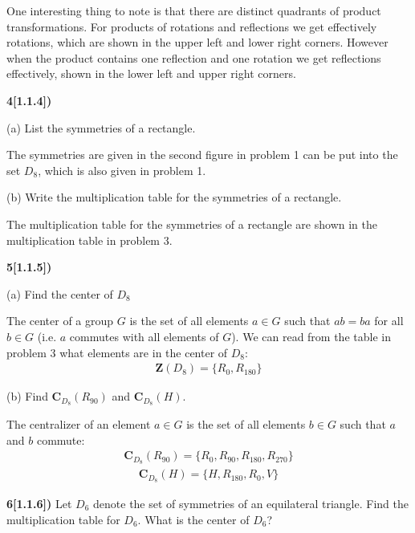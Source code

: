 \documentclass[12pt,a4paper]{article}
\newcommand{\prob}[2]{\textbf{#1)} #2}
\begin{document}
One interesting thing to note is that there are distinct quadrants of product transformations. For products of rotations and reflections we get effectively rotations, which are shown in the upper left and lower right corners. However when the product contains one reflection and one rotation we get reflections effectively, shown in the lower left and upper right corners.

\prob{4[1.1.4]}{}

(a) List the symmetries of a rectangle.

The symmetries are given in the second figure in problem 1 can be put into the set $D_8$, which is also given in problem 1.

(b) Write the multiplication table for the symmetries of a rectangle.

The multiplication table for the symmetries of a rectangle are shown in the multiplication table in problem 3.

\prob{5[1.1.5]}{}

(a) Find the center of $D_8$

The center of a group $G$ is the set of all elements $a \in G$ such that $ab = ba$ for all $b \in G$ (i.e. $a$ commutes with all elements of $G$). We can read from the table in problem 3 what elements are in the center of $D_8$:
\begin{align*}
\mathbf{Z}(D_8) = \{R_0,R_{180}\}
\end{align*}

(b) Find $\mathbf{C}_{D_8}(R_{90})$ and $\mathbf{C}_{D_8}(H)$.

The centralizer of an element $a \in G$ is the set of all elements $b \in G$ such that $a$ and $b$ commute:
\begin{align*}
\mathbf{C}_{D_8}(R_{90}) = \{R_{0},R_{90},R_{180},R_{270}\}
\end{align*}
\begin{align*}
\mathbf{C}_{D_8}(H) = \{H,R_{180},R_{0},V\}
\end{align*}

\prob{6[1.1.6]}{Let $D_6$ denote the set of symmetries of an equilateral triangle. Find the multiplication table for $D_6$. What is the center of $D_6$?}
\end{document}
